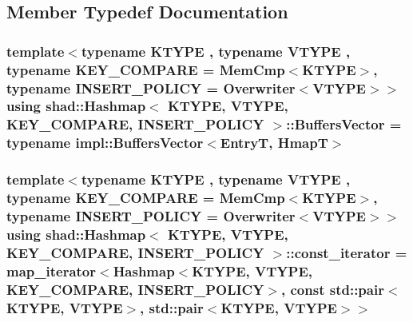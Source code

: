 \subsection{Member Typedef Documentation}
\hypertarget{classshad_1_1Hashmap_abe8958800566729b4fe4b46d0e5d8f70}{
\subsubsection[{Buffers\-Vector}]{\setlength{\rightskip}{0pt plus 5cm}template$<$typename K\-T\-Y\-P\-E , typename V\-T\-Y\-P\-E , typename K\-E\-Y\-\_\-\-C\-O\-M\-P\-A\-R\-E  = Mem\-Cmp$<$\-K\-T\-Y\-P\-E$>$, typename I\-N\-S\-E\-R\-T\-\_\-\-P\-O\-L\-I\-C\-Y  = Overwriter$<$\-V\-T\-Y\-P\-E$>$$>$ using {\bf shad\-::\-Hashmap}$<$ K\-T\-Y\-P\-E, V\-T\-Y\-P\-E, K\-E\-Y\-\_\-\-C\-O\-M\-P\-A\-R\-E, I\-N\-S\-E\-R\-T\-\_\-\-P\-O\-L\-I\-C\-Y $>$\-::{\bf Buffers\-Vector} =  typename impl\-::\-Buffers\-Vector$<${\bf Entry\-T}, {\bf Hmap\-T}$>$}}\label{classshad_1_1Hashmap_abe8958800566729b4fe4b46d0e5d8f70}
\hypertarget{classshad_1_1Hashmap_a1f8a379c42bc2d4b67dcc9f519dc537e}{
\subsubsection[{const\-\_\-iterator}]{\setlength{\rightskip}{0pt plus 5cm}template$<$typename K\-T\-Y\-P\-E , typename V\-T\-Y\-P\-E , typename K\-E\-Y\-\_\-\-C\-O\-M\-P\-A\-R\-E  = Mem\-Cmp$<$\-K\-T\-Y\-P\-E$>$, typename I\-N\-S\-E\-R\-T\-\_\-\-P\-O\-L\-I\-C\-Y  = Overwriter$<$\-V\-T\-Y\-P\-E$>$$>$ using {\bf shad\-::\-Hashmap}$<$ K\-T\-Y\-P\-E, V\-T\-Y\-P\-E, K\-E\-Y\-\_\-\-C\-O\-M\-P\-A\-R\-E, I\-N\-S\-E\-R\-T\-\_\-\-P\-O\-L\-I\-C\-Y $>$\-::{\bf const\-\_\-iterator} =  {\bf map\-\_\-iterator}$<${\bf Hashmap}$<$K\-T\-Y\-P\-E, V\-T\-Y\-P\-E, K\-E\-Y\-\_\-\-C\-O\-M\-P\-A\-R\-E, I\-N\-S\-E\-R\-T\-\_\-\-P\-O\-L\-I\-C\-Y$>$, const std\-::pair$<$K\-T\-Y\-P\-E, V\-T\-Y\-P\-E$>$, std\-::pair$<$K\-T\-Y\-P\-E, V\-T\-Y\-P\-E$>$$>$}}\label{classshad_1_1Hashmap_a1f8a379c42bc2d4b67dcc9f519dc537e}

